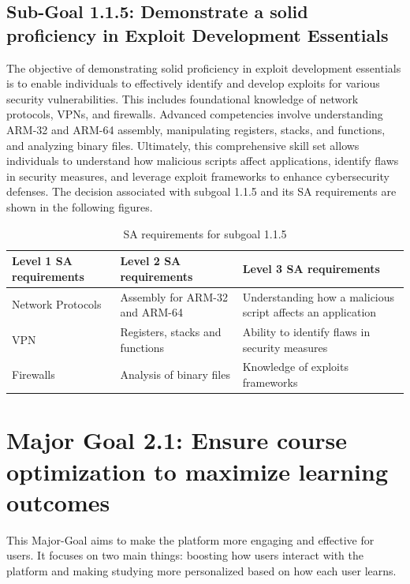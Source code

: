 \newpage
\subsection{Sub-Goal 1.1.5: Demonstrate a solid proficiency in Exploit Development Essentials}
The objective of demonstrating solid proficiency in exploit development essentials is to enable individuals to effectively identify and develop exploits for various security vulnerabilities. This includes foundational knowledge of network protocols, VPNs, and firewalls. Advanced competencies involve understanding ARM-32 and ARM-64 assembly, manipulating registers, stacks, and functions, and analyzing binary files. Ultimately, this comprehensive skill set allows individuals to understand how malicious scripts affect applications, identify flaws in security measures, and leverage exploit frameworks to enhance cybersecurity defenses.
The decision associated with subgoal 1.1.5 and its SA requirements are shown in the following figures.

\begin{table}[H]
    \begin{center}
    \begin{tabular}{ | m{5cm} | m{5cm}| m{5cm} | } 
      \hline
      \textbf{Level 1 SA requirements} & \textbf{Level 2 SA requirements}  & \textbf{Level 3 SA requirements}  \\ 
      \hline
      Network Protocols & Assembly for ARM-32 and ARM-64 & Understanding how a malicious script affects an application\\ 
      \hline
      VPN &  Registers, stacks and functions & Ability to identify flaws in security measures\\ 
      \hline
      Firewalls & Analysis of binary files & Knowledge of exploits frameworks\\  
      \hline
    \end{tabular}
    \end{center}
    \caption{SA requirements for subgoal 1.1.5}
    \end{table}

\newpage
\section{Major Goal 2.1: Ensure course optimization to maximize learning outcomes}
This Major-Goal aims to make the platform more engaging and effective for users. It focuses on two main things: boosting how users interact with the platform and making studying more personalized based on how each user learns.

